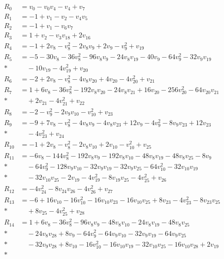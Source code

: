 \begingroup
\small
\allowdisplaybreaks[4]
\setlength{\jot}{3.8pt}
\begin{align*}
R_{0}&=v_{0}-v_{0}v_{4}-v_{4}+v_{7}\\[2pt]
R_{1}&=-1+v_{1}-v_{2}-v_{4}v_{5}\\[2pt]
R_{2}&=-1+v_{1}-v_{6}v_{7}\\[2pt]
R_{3}&=1+v_{2}-v_{3}v_{18}+2v_{16}\\[2pt]
R_{4}&=-1+2v_{8}-v_{8}^{2}-2v_{8}v_{9}+2v_{9}-v_{9}^{2}+v_{19}\\[2pt]
R_{5}&=-5-30v_{8}-36v_{8}^{2}-96v_{8}v_{9}-24v_{8}v_{19}-40v_{9}-64v_{9}^{2}-32v_{9}v_{19}\\*
&\quad-10v_{19}-4v_{19}^{2}+v_{20}\\[2pt]
R_{6}&=-2+2v_{8}-v_{8}^{2}-4v_{8}v_{20}+4v_{20}-4v_{20}^{2}+v_{21}\\[2pt]
R_{7}&=1+6v_{8}-36v_{8}^{2}-192v_{8}v_{20}-24v_{8}v_{21}+16v_{20}-256v_{20}^{2}-64v_{20}v_{21}\\*
&\quad+2v_{21}-4v_{21}^{2}+v_{22}\\[2pt]
R_{8}&=-2-v_{9}^{2}-2v_{9}v_{10}-v_{10}^{2}+v_{23}\\[2pt]
R_{9}&=-9+7v_{8}-v_{8}^{2}-4v_{8}v_{9}-4v_{8}v_{23}+12v_{9}-4v_{9}^{2}-8v_{9}v_{23}+12v_{23}\\*
&\quad-4v_{23}^{2}+v_{24}\\[2pt]
R_{10}&=-1+2v_{8}-v_{8}^{2}-2v_{8}v_{10}+2v_{10}-v_{10}^{2}+v_{25}\\[2pt]
R_{11}&=-6v_{8}-144v_{8}^{2}-192v_{8}v_{9}-192v_{8}v_{10}-48v_{8}v_{19}-48v_{8}v_{25}-8v_{9}\\*
&\quad-64v_{9}^{2}-128v_{9}v_{10}-32v_{9}v_{19}-32v_{9}v_{25}-64v_{10}^{2}-32v_{10}v_{19}\\*
&\quad-32v_{10}v_{25}-2v_{19}-4v_{19}^{2}-8v_{19}v_{25}-4v_{25}^{2}+v_{26}\\[2pt]
R_{12}&=-4v_{24}^{2}-8v_{24}v_{26}-4v_{26}^{2}+v_{27}\\[2pt]
R_{13}&=-6+16v_{10}-16v_{10}^{2}-16v_{10}v_{23}-16v_{10}v_{25}+8v_{23}-4v_{23}^{2}-8v_{23}v_{25}\\*
&\quad+8v_{25}-4v_{25}^{2}+v_{28}\\[2pt]
R_{14}&=1+6v_{8}-36v_{8}^{2}-96v_{8}v_{9}-48v_{8}v_{10}-24v_{8}v_{19}-48v_{8}v_{25}\\*
&\quad-24v_{8}v_{28}+8v_{9}-64v_{9}^{2}-64v_{9}v_{10}-32v_{9}v_{19}-64v_{9}v_{25}\\*
&\quad-32v_{9}v_{28}+8v_{10}-16v_{10}^{2}-16v_{10}v_{19}-32v_{10}v_{25}-16v_{10}v_{28}+2v_{19}\\*

\end{align*}
